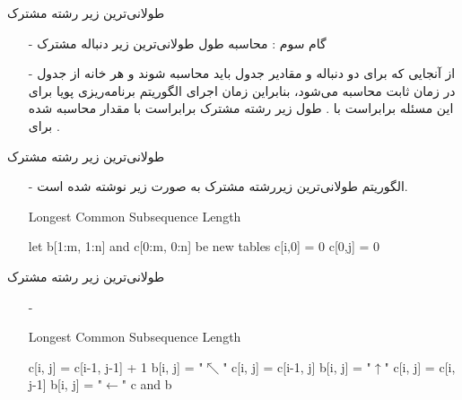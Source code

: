 \begin{frame}{‌طولانی‌ترین زیر رشته مشترک}
\begin{itemize}\itemr
\item[-]
گام سوم : محاسبه طول طولانی‌ترین زیر دنباله مشترک
\item[-]
از آنجایی که برای دو دنباله
و
مقادیر جدول
باید محاسبه شوند و هر خانه از جدول در زمان ثابت
محاسبه می‌شود، بنابراین زمان اجرای الگوریتم برنامه‌ریزی پویا برای این مسئله برابراست با
. طول زیر رشته مشترک برابراست با مقدار محاسبه شده برای
.
\end{itemize}
\end{frame}


\begin{frame}{‌طولانی‌ترین زیر رشته مشترک}
\begin{itemize}\itemr
\item[-]
الگوریتم طولانی‌ترین زیررشته مشترک به صورت زیر نوشته شده است.
\begin{algorithm}[H]\alglr
  \caption{Longest Common Subsequence Length} 
  \begin{algorithmic}[1]
    \State let b[1:m, 1:n] and c[0:m, 0:n] be new tables
      		\State c[i,0] = 0
       \EndFor
      		\State c[0,j] = 0
       \EndFor                                       
  \end{algorithmic}
  \label{alg:merge}
\end{algorithm}
\end{itemize}
\end{frame}


\begin{frame}{‌طولانی‌ترین زیر رشته مشترک}
\begin{itemize}\itemr
\item[-]
\begin{algorithm}[H]\alglr
  \caption{Longest Common Subsequence Length} 
  \begin{algorithmic}[1]
   \setcounter{ALG@line}{5}
    	  
        			\State c[i, j] = c[i-1, j-1] + 1
        			\State b[i, j] = "$\nwarrow$"
        			\State c[i, j] = c[i-1, j] 
        			\State b[i, j] = "$\uparrow$"
        		\Else
        		    \State c[i, j] = c[i, j-1]
        			\State b[i, j] = "$\leftarrow$"
        		\EndIf
        	\EndFor
        \EndFor
    \State \Return c and b	                                         
  \end{algorithmic}
  \label{alg:merge}
\end{algorithm}
\end{itemize}
\end{frame}


